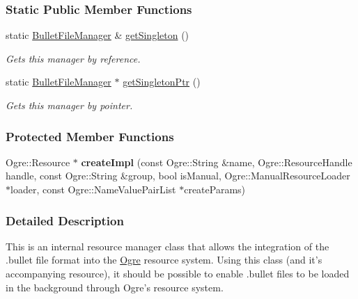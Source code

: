 \subsubsection*{Static Public Member Functions}
\begin{DoxyCompactItemize}
\item 
static \hyperlink{classMezzanine_1_1internal_1_1BulletFileManager}{BulletFileManager} \& \hyperlink{classMezzanine_1_1internal_1_1BulletFileManager_a1abcc7368bfa4d6037fe28dd28841603}{getSingleton} ()
\begin{DoxyCompactList}\small\item\em Gets this manager by reference. \item\end{DoxyCompactList}\item 
static \hyperlink{classMezzanine_1_1internal_1_1BulletFileManager}{BulletFileManager} $\ast$ \hyperlink{classMezzanine_1_1internal_1_1BulletFileManager_a2309b1a7ddd1459f66411483db78b06d}{getSingletonPtr} ()
\begin{DoxyCompactList}\small\item\em Gets this manager by pointer. \item\end{DoxyCompactList}\end{DoxyCompactItemize}
\subsubsection*{Protected Member Functions}
\begin{DoxyCompactItemize}
\item 
\hypertarget{classMezzanine_1_1internal_1_1BulletFileManager_ad9e17ed4d31fa737301aefbd9b10e4d9}{
Ogre::Resource $\ast$ {\bfseries createImpl} (const Ogre::String \&name, Ogre::ResourceHandle handle, const Ogre::String \&group, bool isManual, Ogre::ManualResourceLoader $\ast$loader, const Ogre::NameValuePairList $\ast$createParams)}
\label{classMezzanine_1_1internal_1_1BulletFileManager_ad9e17ed4d31fa737301aefbd9b10e4d9}

\end{DoxyCompactItemize}


\subsubsection{Detailed Description}
This is an internal resource manager class that allows the integration of the .bullet file format into the \hyperlink{namespaceOgre}{Ogre} resource system. Using this class (and it's accompanying resource), it should be possible to enable .bullet files to be loaded in the background through Ogre's resource system. 

